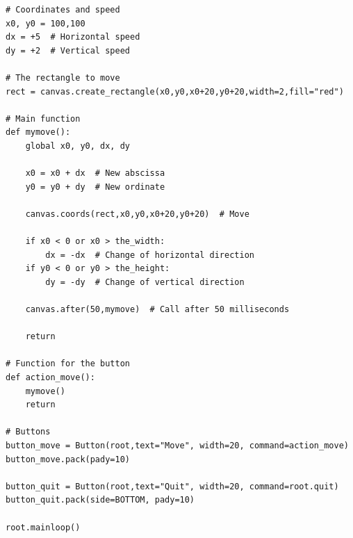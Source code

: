 \documentclass[11pt,class=report,crop=false]{standalone}
\begin{document}
\begin{cours}
\begin{lstlisting}
# Coordinates and speed
x0, y0 = 100,100
dx = +5  # Horizontal speed
dy = +2  # Vertical speed

# The rectangle to move
rect = canvas.create_rectangle(x0,y0,x0+20,y0+20,width=2,fill="red")

# Main function
def mymove():
    global x0, y0, dx, dy

    x0 = x0 + dx  # New abscissa
    y0 = y0 + dy  # New ordinate

    canvas.coords(rect,x0,y0,x0+20,y0+20)  # Move

    if x0 < 0 or x0 > the_width:
        dx = -dx  # Change of horizontal direction
    if y0 < 0 or y0 > the_height:
        dy = -dy  # Change of vertical direction

    canvas.after(50,mymove)  # Call after 50 milliseconds
 
    return
    
# Function for the button
def action_move():
    mymove()
    return

# Buttons
button_move = Button(root,text="Move", width=20, command=action_move)
button_move.pack(pady=10)

button_quit = Button(root,text="Quit", width=20, command=root.quit)
button_quit.pack(side=BOTTOM, pady=10)

root.mainloop()
\end{lstlisting}

\end{cours}
\end{document}
